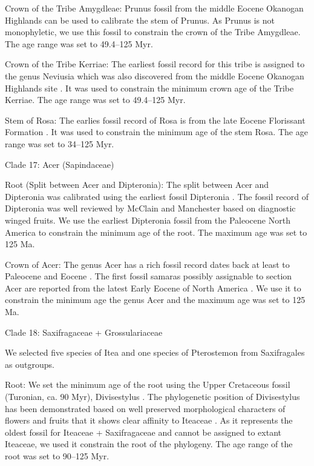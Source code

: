 \documentclass[10pt]{article}
\begin{document}
Crown of the Tribe Amygdleae: Prunus fossil from the middle Eocene
Okanogan Highlands \citep{DeVore and Pigg 2007} can be used to
calibrate the stem of Prunus. As Prunus is not monophyletic, we use
this fossil to constrain the crown of the Tribe Amygdleae. The age
range was set to 49.4--125 Myr.

Crown of the Tribe Kerriae: The earliest fossil record for this tribe
is assigned to the genus Neviusia which was also discovered from the
middle Eocene Okanogan Highlands site \citep{DeVore, Moore et
  al. 2004}. It was used to constrain the minimum crown age of the
Tribe Kerriae. The age range was set to 49.4--125 Myr.

Stem of Rosa: The earlies fossil record of Rosa is from the late
Eocene Florissant Formation \citep{Manchester 2001}. It was used to
constrain the minimum age of the stem Rosa. The age range was set to
34--125 Myr.

Clade 17: Acer (Sapindaceae)

Root (Split between Acer and Dipteronia):  The split between Acer and
Dipteronia was calibrated using the earliest fossil Dipteronia
\citep{McClain and Manchester 2001}. The fossil record of Dipteronia
was well reviewed by McClain and Manchester \citep{McClain and
  Manchester 2001} based on diagnostic winged fruits. We use the
earliest Dipteronia fossil from the Paleocene North America to
constrain the minimum age of the root. The maximum age was set to 125
Ma.

Crown of Acer: The genus Acer has a rich fossil record dates back at
least to Paleocene and Eocene \citep{Wolfe and Tanai 1987, Mai
  1995}. The first fossil samaras possibly assignable to section Acer
are reported from the latest Early Eocene of North America
\citep{Wolfe and Tanai 1987}. We use it to constrain the minimum age
the genus Acer and the maximum age was set to 125 Ma. 

Clade 18: Saxifragaceae + Grossulariaceae

We selected five species of Itea and one species of Pterostemon from
Saxifragales as outgroups. 

Root: We set the minimum age of the root using the Upper Cretaceous
fossil (Turonian, ca. 90 Myr), Divisestylus \citep{Hermsen, Gandolfo
  et al. 2003}. The phylogenetic position of Divisestylus has been
demonstrated based on well preserved morphological characters of
flowers and fruits that it shows clear affinity to Iteaceae
\citep{Hermsen, Gandolfo et al. 2003}. As it represents the oldest
fossil for Iteaceae + Saxifragaceae and cannot be assigned to extant
Iteaceae, we used it constrain the root of the phylogeny. The age
range of the root was set to 90--125 Myr.
\end{document}
